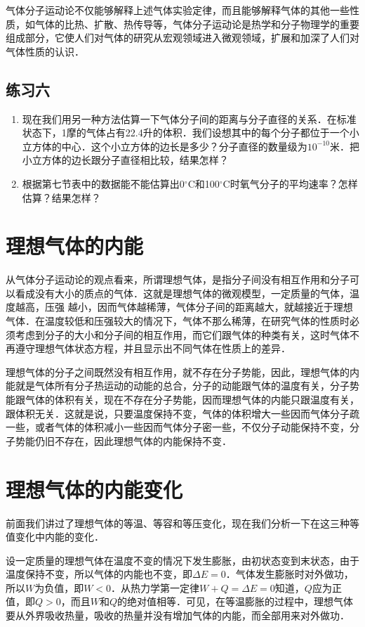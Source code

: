 气体分子运动论不仅能够解释上述气体实验定律，而且能够解释气体的其他一些性质，如气体的比热、扩散、热传导等，气体分子运动论是热学和分子物理学的重要组成部分，它使人们对气体的研究从宏观领域进入微观领域，扩展和加深了人们对气体性质的认识．


\subsection*{练习六}

\begin{enumerate}
    \item 现在我们用另一种方法估算一下气体分子间的距离与分子直径的关系．在标准状态下，1摩的气体占有22.4升的体积．我们设想其中的每个分子都位于一个小立方体的中心．这个小立方体的边长是多少？分子直径的数量级为$10^{-10}$米．把小立方体的边长跟分子直径相比较，结果怎样？
\item 根据第七节表中的数据能不能估算出0$^\circ$C和100$^\circ$C时氧气分子的平均速率？怎样估算？结果怎样？
\end{enumerate}

\section{理想气体的内能}
从气体分子运动论的观点看来，所谓理想气体，是指分子间没有相互作用和分子可以看成没有大小的质点的气体．这就是理想气体的微观模型，一定质量的气体，温度越高，压强
越小，因而气体越稀薄，气体分子间的距离越大，就越接近于理想气体．在温度较低和压强较大的情况下，气体不那么稀薄，在研究气体的性质时必须考虑到分子的大小和分子间的相互作用，而它们跟气体的种类有关，这时气体不再遵守理想气体状态方程，并且显示出不同气体在性质上的差异．

理想气体的分子之间既然没有相互作用，就不存在分子势能，因此，理想气体的内能就是气体所有分子热运动的动能的总合，分子的动能跟气体的温度有关，分子势能跟气体的体积有关，现在不存在分子势能，因而理想气体的内能只跟温度有关，跟体积无关．这就是说，只要温度保持不变，气体的体积增大一些因而气体分子疏一些，或者气体的体积减小一些因而气体分子密一些，不仅分子动能保持不变，分子势能仍旧不存在，因此理想气体的内能保持不变．

\section{理想气体的内能变化}
前面我们讲过了理想气体的等温、等容和等压变化，现在我们分析一下在这三种等值变化中内能的变化．

设一定质量的理想气体在温度不变的情况下发生膨胀，由初状态变到末状态，由于温度保持不变，所以气体的内能也不变，即$\Delta E=0$．气体发生膨胀时对外做功，所以$W$为负值，即$W<0$．从热力学第一定律$W+Q=\Delta E=0$知道，$Q$应为正值，即$Q>0$，而且$W$和$Q$的绝对值相等．可见，在等温膨胀的过程中，理想气体要从外界吸收热量，吸收的热量并没有增加气体的内能，而全部用来对外做功．

